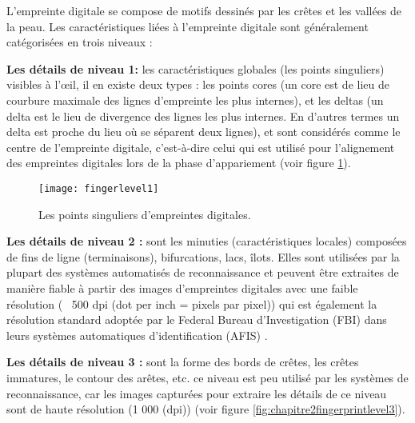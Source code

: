 L’empreinte digitale se compose de motifs dessinés par les crêtes et les vallées de la peau. Les caractéristiques liées à l’empreinte digitale sont généralement catégorisées en trois niveaux \citep{hasan2013fingerprint} :
\begin{enumerate}
	
	\noindent\begin{minipage}{0.7\textwidth}%
		\item 	\textbf{Les détails de niveau 1: }les caractéristiques globales (les points singuliers) visibles à l'œil, il en existe deux types : les points cores (un core est de lieu de courbure maximale des lignes d'empreinte les plus internes), et les deltas (un delta est le lieu de divergence des lignes les plus internes. En d’autres termes un delta est proche du lieu où se séparent deux lignes), et sont considérés comme le centre de l'empreinte digitale, c'est-à-dire celui qui est utilisé pour l'alignement des empreintes digitales lors de la phase d’appariement (voir figure \ref{fig:chapitre2fingerprintlevel1}).   
		
	\end{minipage}%
	\hfill%
	\begin{minipage}{0.3\textwidth}\raggedleft
		\begin{center}
			\begin{figure}[H]
				\centering
				\texttt{[image: fingerlevel1]}
				\captionsetup{justification=centering}
				\caption{Les points singuliers d'empreintes digitales.}
				\label{fig:chapitre2fingerprintlevel1}
			\end{figure}
		\end{center}
		
	\end{minipage}%
	\item \textbf{Les détails de niveau 2 : }sont les minuties (caractéristiques locales) composées de fins de ligne (terminaisons), bifurcations, lacs, îlots. Elles sont utilisées par la plupart des systèmes automatisés de reconnaissance et peuvent être extraites de manière fiable à partir des images d'empreintes digitales avec une faible résolution (~ 500 dpi (dot per inch = pixels par pixel)) qui est également la résolution standard adoptée par le Federal Bureau d’Investigation (FBI) dans leurs systèmes automatiques d’identification (AFIS) \citep{jain2007pores}.
	
	
	\item \textbf{Les détails de niveau 3 :} sont la forme des bords de crêtes, les crêtes immatures, le contour des arêtes, etc. ce niveau est peu utilisé par les systèmes de reconnaissance, car les images capturées pour extraire les détails de ce niveau sont de haute résolution (1 000 (dpi)) (voir figure \ref{fig:chapitre2fingerprintlevel3}). 
	

\end{enumerate}
